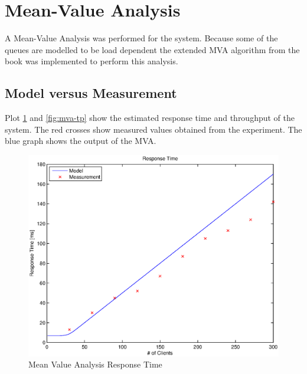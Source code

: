 \documentclass[a4paper]{article}
\begin{document}
\npnoround


\section{Mean-Value Analysis}

A Mean-Value Analysis was performed for the system. Because some of the queues are modelled to be load dependent the extended MVA algorithm from the book \cite[Box 36.1]{Raj} was implemented to perform this analysis.

\subsection{Model versus Measurement}
Plot \ref{fig:mva-rt} and \ref{fig:mva-tp} show the estimated response time and throughput of the system. The red crosses show measured values obtained from the experiment. The blue graph shows the output of the MVA.



\begin{figure}[H]
	\begin{center}
    \includegraphics[scale=0.6]{../plots-ms2-mg/mva-rt.eps}
  \end{center}
  \caption{Mean Value Analysis Response Time}
  \label{fig:mva-rt}
\end{figure}

\end{document}
